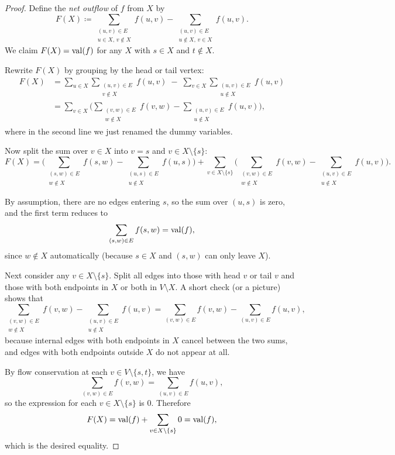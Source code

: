 \documentclass[11pt]{article}
\begin{document}
\begin{proof}
Define the \emph{net outflow} of $f$ from $X$ by
\[
  F(X) \coloneqq
  \sum_{\substack{(u,v)\in E\\ u\in X,\, v\notin X}} f(u,v)
  - \sum_{\substack{(u,v)\in E\\ u\notin X,\, v\in X}} f(u,v).
\]
We claim $F(X)=\mathrm{val}(f)$ for any $X$ with $s\in X$ and $t\notin X$.

Rewrite $F(X)$ by grouping by the head or tail vertex:
\begin{align*}
  F(X)
  &= \sum_{u\in X} \sum_{\substack{(u,v)\in E\\ v\notin X}} f(u,v)
     \;-\;
     \sum_{v\in X} \sum_{\substack{(u,v)\in E\\ u\notin X}} f(u,v) \\
  &= \sum_{v\in X} \biggl(
      \sum_{\substack{(v,w)\in E\\ w\notin X}} f(v,w)
      - \sum_{\substack{(u,v)\in E\\ u\notin X}} f(u,v)
     \biggr),
\end{align*}
where in the second line we just renamed the dummy variables.

Now split the sum over $v\in X$ into $v=s$ and $v\in X\setminus\{s\}$:
\[
  F(X)
  = \biggl(
      \sum_{\substack{(s,w)\in E\\ w\notin X}} f(s,w)
      - \sum_{\substack{(u,s)\in E\\ u\notin X}} f(u,s)
    \biggr)
    + \sum_{v\in X\setminus\{s\}} \biggl(
      \sum_{\substack{(v,w)\in E\\ w\notin X}} f(v,w)
      - \sum_{\substack{(u,v)\in E\\ u\notin X}} f(u,v)
    \biggr).
\]

By assumption, there are no edges entering $s$, so the sum over $(u,s)$ is
zero, and the first term reduces to
\[
  \sum_{(s,w)\in E} f(s,w) = \mathrm{val}(f),
\]
since $w\notin X$ automatically (because $s\in X$ and $(s,w)$ can only leave
$X$).

Next consider any $v\in X\setminus\{s\}$. Split all edges into those with head
$v$ or tail $v$ and those with both endpoints in $X$ or both in $V\setminus X$.
A short check (or a picture) shows that
\[
  \sum_{\substack{(v,w)\in E\\ w\notin X}} f(v,w)
  - \sum_{\substack{(u,v)\in E\\ u\notin X}} f(u,v)
  =
  \sum_{(v,w)\in E} f(v,w)
  - \sum_{(u,v)\in E} f(u,v),
\]
because internal edges with both endpoints in $X$ cancel between the two
sums, and edges with both endpoints outside $X$ do not appear at all.

By flow conservation at each $v\in V\setminus\{s,t\}$, we have
\[
  \sum_{(v,w)\in E} f(v,w)
  = \sum_{(u,v)\in E} f(u,v),
\]
so the expression for each $v\in X\setminus\{s\}$ is $0$. Therefore
\[
  F(X) = \mathrm{val}(f) + \sum_{v\in X\setminus\{s\}} 0 = \mathrm{val}(f),
\]
which is the desired equality.
\end{proof}
\end{document}
